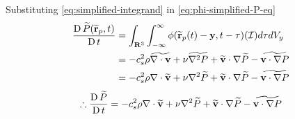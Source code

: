 Substituting \ref{eq:simplified-integrand} in \ref{eq:phi-simplified-P-eq}
\begin{equation}
    \begin{split}
        \frac{\operatorname{D} \widetilde{P}(\widetilde{\mathbf{r}}_p, t)}{\operatorname{D} t} & = \int_{\mathbf{R}^3} \int_{-\infty}^{\infty} \phi (\widetilde{\mathbf{r}}_p(t)-\mathbf{y}, t-\tau) (\mathcal{I}) d \tau d V_y \\
        & = -c_s^2 \rho \widetilde{\nabla \cdot \mathbf{v}} + \nu \widetilde{\nabla^2 P} + \widetilde{\mathbf{v}} \cdot \nabla \widetilde{P} - \widetilde{\mathbf{v} \cdot \nabla P} \\
        & = -c_s^2 \rho \nabla \cdot \widetilde{\mathbf{v}} + \nu \nabla^2 \widetilde{P}  + \widetilde{\mathbf{v}} \cdot \nabla \widetilde{P} - \widetilde{\mathbf{v} \cdot \nabla P}
    \end{split}
\end{equation}
\begin{equation}
    \therefore \frac{\operatorname{D} \widetilde{P}}{\operatorname{D} t} = -c_s^2 \rho \nabla \cdot \widetilde{\mathbf{v}} + \nu \nabla^2 \widetilde{P} + \widetilde{\mathbf{v}} \cdot \nabla \widetilde{P} - \widetilde{\mathbf{v}\cdot\nabla P}
\end{equation}

